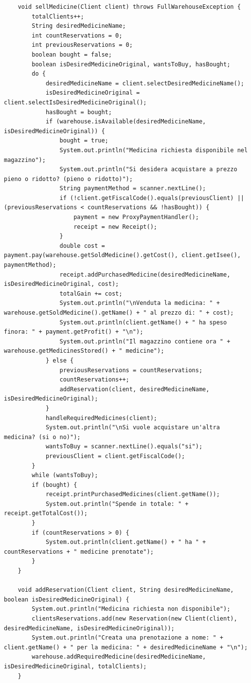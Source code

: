\documentclass[a4paper, 10pt]{report}
\begin{document}
\begin{lstlisting}
    void sellMedicine(Client client) throws FullWarehouseException {
        totalClients++;
        String desiredMedicineName;
        int countReservations = 0;
        int previousReservations = 0;
        boolean bought = false;
        boolean isDesiredMedicineOriginal, wantsToBuy, hasBought;
        do {
            desiredMedicineName = client.selectDesiredMedicineName();
            isDesiredMedicineOriginal = client.selectIsDesiredMedicineOriginal();
            hasBought = bought;
            if (warehouse.isAvailable(desiredMedicineName, isDesiredMedicineOriginal)) {
                bought = true;
                System.out.println("Medicina richiesta disponibile nel magazzino");
                System.out.println("Si desidera acquistare a prezzo pieno o ridotto? (pieno o ridotto)");
                String paymentMethod = scanner.nextLine();
                if (!client.getFiscalCode().equals(previousClient) || (previousReservations < countReservations && !hasBought)) {
                    payment = new ProxyPaymentHandler();
                    receipt = new Receipt();
                }
                double cost = payment.pay(warehouse.getSoldMedicine().getCost(), client.getIsee(), paymentMethod);
                receipt.addPurchasedMedicine(desiredMedicineName, isDesiredMedicineOriginal, cost);
                totalGain += cost;
                System.out.println("\nVenduta la medicina: " + warehouse.getSoldMedicine().getName() + " al prezzo di: " + cost);
                System.out.println(client.getName() + " ha speso finora: " + payment.getProfit() + "\n");
                System.out.println("Il magazzino contiene ora " + warehouse.getMedicinesStored() + " medicine");
            } else {
                previousReservations = countReservations;
                countReservations++;
                addReservation(client, desiredMedicineName, isDesiredMedicineOriginal);
            }
            handleRequiredMedicines(client);
            System.out.println("\nSi vuole acquistare un'altra medicina? (si o no)");
            wantsToBuy = scanner.nextLine().equals("si");
            previousClient = client.getFiscalCode();
        }
        while (wantsToBuy);
        if (bought) {
            receipt.printPurchasedMedicines(client.getName());
            System.out.println("Spende in totale: " + receipt.getTotalCost());
        }
        if (countReservations > 0) {
            System.out.println(client.getName() + " ha " + countReservations + " medicine prenotate");
        }
    }

    void addReservation(Client client, String desiredMedicineName, boolean isDesiredMedicineOriginal) {
        System.out.println("Medicina richiesta non disponibile");
        clientsReservations.add(new Reservation(new Client(client), desiredMedicineName, isDesiredMedicineOriginal));
        System.out.println("Creata una prenotazione a nome: " + client.getName() + " per la medicina: " + desiredMedicineName + "\n");
        warehouse.addRequiredMedicine(desiredMedicineName, isDesiredMedicineOriginal, totalClients);
    }


\end{lstlisting}
\end{document}
